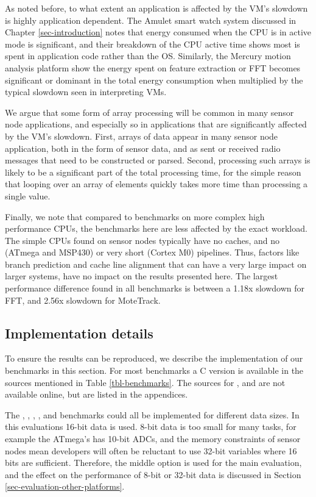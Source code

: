 As noted before, to what extent an application is affected by the VM's slowdown is highly application dependent. The Amulet smart watch system discussed in Chapter \ref{sec-introduction} notes that energy consumed when the CPU is in active mode is significant, and their breakdown of the CPU active time shows most is spent in application code rather than the OS. Similarly, the Mercury motion analysis platform show the energy spent on feature extraction or FFT becomes significant or dominant in the total energy consumption when multiplied by the typical slowdown seen in interpreting VMs.

We argue that some form of array processing will be common in many sensor node applications, and especially so in applications that are significantly affected by the VM's slowdown. First, arrays of data appear in many sensor node application, both in the form of sensor data, and as sent or received radio messages that need to be constructed or parsed. Second, processing such arrays is likely to be a significant part of the total processing time, for the simple reason that looping over an array of elements quickly takes more time than processing a single value.

Finally, we note that compared to benchmarks on more complex high performance CPUs, the benchmarks here are less affected by the exact workload. The simple CPUs found on sensor nodes typically have no caches, and no (ATmega and MSP430) or very short (Cortex M0) pipelines. Thus, factors like branch prediction and cache line alignment that can have a very large impact on larger systems, have no impact on the results presented here. The largest performance difference found in all benchmarks is between a 1.18x slowdown for FFT, and 2.56x slowdown for MoteTrack.

\subsection{Implementation details}
To ensure the results can be reproduced, we describe the implementation of our benchmarks in this section. For most benchmarks a C version is available in the sources mentioned in Table \ref{tbl-benchmarks}. The sources for ,  and  are not available online, but are listed in the appendices.

The , , , , and  benchmarks could all be implemented for different data sizes. In this evaluations 16-bit data is used. 8-bit data is too small for many tasks, for example the ATmega's has 10-bit ADCs, and the memory constraints of sensor nodes mean developers will often be reluctant to use 32-bit variables where 16 bits are sufficient. Therefore, the middle option is used for the main evaluation, and the effect on the performance of 8-bit or 32-bit data is discussed in Section \ref{sec-evaluation-other-platforms}.


